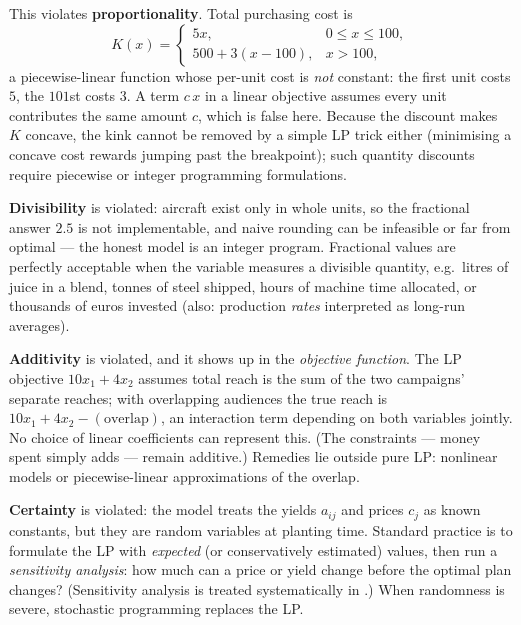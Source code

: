 \begin{solutions}
  \item This violates \textbf{proportionality}. Total purchasing cost is
        \[
          K(x)=
          \begin{cases}
            5x, & 0\le x\le 100,\\
            500+3(x-100), & x>100,
          \end{cases}
        \]
        a piecewise-linear function whose per-unit cost is \emph{not}
        constant: the first unit costs $5$, the $101$st costs $3$. A term
        $c\,x$ in a linear objective assumes every unit contributes the
        same amount $c$, which is false here. Because the discount makes
        $K$ concave, the kink cannot be removed by a simple LP trick
        either (minimising a concave cost rewards jumping past the
        breakpoint); such quantity discounts require piecewise or integer
        programming formulations.

  \item \textbf{Divisibility} is violated: aircraft exist only in whole
        units, so the fractional answer $2.5$ is not implementable, and
        naive rounding can be infeasible or far from optimal — the honest
        model is an integer program. Fractional values are perfectly
        acceptable when the variable measures a divisible quantity, e.g.\
        litres of juice in a blend, tonnes of steel shipped, hours of
        machine time allocated, or thousands of euros invested (also:
        production \emph{rates} interpreted as long-run averages).

  \item \textbf{Additivity} is violated, and it shows up in the
        \emph{objective function}. The LP objective $10x_1+4x_2$ assumes
        total reach is the sum of the two campaigns' separate reaches; with
        overlapping audiences the true reach is
        $10x_1+4x_2-(\text{overlap})$, an interaction term depending on
        both variables jointly. No choice of linear coefficients can
        represent this. (The constraints — money spent simply adds — remain
        additive.) Remedies lie outside pure LP: nonlinear models or
        piecewise-linear approximations of the overlap.

  \item \textbf{Certainty} is violated: the model treats the yields
        $a_{ij}$ and prices $c_j$ as known constants, but they are random
        variables at planting time. Standard practice is to formulate the
        LP with \emph{expected} (or conservatively estimated) values, then
        run a \emph{sensitivity analysis}: how much can a price or yield
        change before the optimal plan changes? (Sensitivity analysis is
        treated systematically in \chref{linprog}{8}.) When randomness is
        severe, stochastic programming replaces the LP.


\end{solutions}
